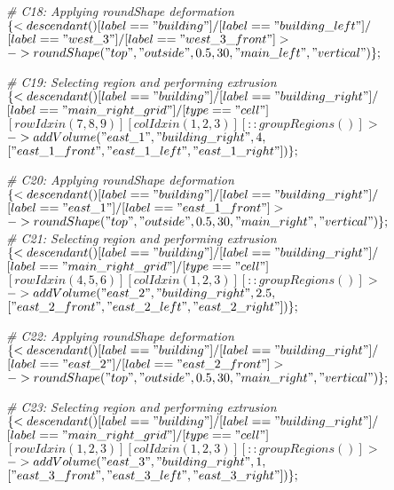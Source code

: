 \noindent \textit{\# C18: Applying roundShape deformation}\\
$\{< descendant() [label=="building"] / [label=="building\_left"] / $\\
$[label=="west\_3"] / [label=="west\_3\_front"] > $\\
$-> roundShape("top", "outside", 0.5, 30, "main\_left", "vertical")\};$

\noindent \textit{\# C19: Selecting region and performing extrusion}\\
$\{< descendant() [label=="building"] / [label=="building\_right"] / $\\
$[label=="main\_right\_grid"] / [type=="cell"] $\\
$[rowIdx in (7, 8, 9)] [colIdx in (1, 2, 3)] [::groupRegions()] > $\\
$-> addVolume("east\_1", "building\_right", 4, $\\
$["east\_1\_front", "east\_1\_left", "east\_1\_right"])\};$

\noindent \textit{\# C20: Applying roundShape deformation}\\
$\{< descendant() [label=="building"] / [label=="building\_right"] / $\\
$[label=="east\_1"] / [label=="east\_1\_front"] > $\\
$-> roundShape("top", "outside", 0.5, 30, "main\_right", "vertical")\};$\\

\noindent \textit{\# C21: Selecting region and performing extrusion}\\
$\{< descendant() [label=="building"] / [label=="building\_right"] / $\\
$[label=="main\_right\_grid"] / [type=="cell"] $\\
$[rowIdx in (4, 5, 6)] [colIdx in (1, 2, 3)] [::groupRegions()] > $\\
$-> addVolume("east\_2", "building\_right", 2.5, $\\
$["east\_2\_front", "east\_2\_left", "east\_2\_right"])\};$

\noindent \textit{\# C22: Applying roundShape deformation}\\
$\{< descendant() [label=="building"] / [label=="building\_right"] / $\\
$[label=="east\_2"] / [label=="east\_2\_front"] > $\\
$-> roundShape("top", "outside", 0.5, 30, "main\_right", "vertical")\};$

\noindent \textit{\# C23: Selecting region and performing extrusion}\\
$\{< descendant() [label=="building"] / [label=="building\_right"] / $\\
$[label=="main\_right\_grid"] / [type=="cell"] $\\
$[rowIdx in (1, 2, 3)] [colIdx in (1, 2, 3)] [::groupRegions()] > $\\
$-> addVolume("east\_3", "building\_right", 1, $\\
$["east\_3\_front", "east\_3\_left", "east\_3\_right"])\};$

